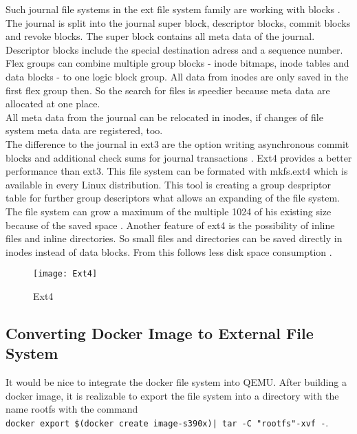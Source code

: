 Such journal file systems in the ext file system family are working with blocks \cite[~p.20]{Seufert2015}.
The journal is split into the journal super block, descriptor blocks, commit blocks and revoke blocks.
The super block contains all meta data of the journal. Descriptor blocks include the special destination adress and a sequence number. 
Flex groups can combine multiple group blocks - inode bitmaps, inode tables and data blocks - to one logic block group. All data from inodes are only saved in the first flex group then. 
So the search for files is speedier because meta data are allocated at one place.\\
All meta data from the journal can be relocated in inodes, if changes of file system meta data are registered, too. \\
The difference to the journal in ext3 are the option writing asynchronous commit blocks and additional check sums for journal transactions \cite[~p.28]{Seufert2015}.
Ext4 provides a better performance than ext3. 
This file system can be formated with mkfs.ext4 which is available in every Linux distribution.
This tool is creating a group despriptor table for further group descriptors what allows an expanding of the file system. The file system can grow a maximum of the multiple 1024 of his existing size because of the saved space \cite[~p.21]{Seufert2015}. 
Another feature of ext4 is the possibility of inline files and inline directories. So small files and directories can be saved directly in inodes instead of data blocks. From this follows less disk space consumption \cite[p.24]{Seufert2015}.

\begin{figure}[H]
\centering
\texttt{[image: Ext4]}
 \caption{Ext4}
    \label{Ext4}
\end{figure}

\subsection{Converting Docker Image to External File System} \label{ExternalFile system}

It would be nice to integrate the docker file system into \gls{QEMU}. After building a docker
image, it is realizable to export the file system into a directory with the name rootfs with
the command \\
\lstinline!docker export $(docker create image-s390x)| tar -C "rootfs"-xvf -!.

